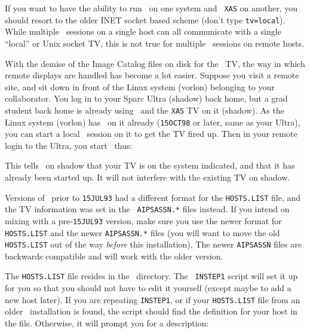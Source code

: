 If you want to have the ability to run \ttaips\ on one system and {\tt
XAS} on another, you should resort to the older INET socket based scheme
(don't type {\tt tv=local}).  While multiple \ttaips\ sessions on a
single host can all communicate with a single ``local'' or Unix socket
TV, this is not true for multiple \ttaips\ sessions on remote hosts.

With the demise of the Image Catalog files on disk for the \AIPS\ TV,
the way in which remote displays are handled has become a lot easier.
Suppose you visit a remote site, and sit down in front of the Linux
system (vorlon) belonging to your collaborator.  You log in to your
Sparc Ultra (shadow) back home, but a grad student back home is already
using \AIPS\ and the {\tt XAS} TV on it (shadow).  As the Linux system
(vorlon) has \AIPS\ on it already ({\tt 15OCT98} or later, same as your
Ultra), you can start a local \ttaips\ session on it to get the TV fired
up.  Then in your remote login to the Ultra, you start \AIPS\ thus:
\medskip

\medskip

\noindent This tells \AIPS\ on shadow that your TV is on the system
indicated, and that it has already been started up.  It will not
interfere with the existing TV on shadow.

Versions of \AIPS\ prior to {\tt 15JUL93} had a different format for the
{\tt HOSTS.LIST} file, and the TV information was set in the {\tt
AIPSASSN.*} files instead.  If you intend on mixing {\tt\THISVER} with a
pre-{\tt 15JUL93} version, make sure you use the newer format for {\tt
HOSTS.LIST} and the newer {\tt AIPSASSN.*} files (you will want to move
the old {\tt HOSTS.LIST} out of the way {\it before\/} this
installation).  The newer {\tt AIPSASSN} files are backwards compatible
and will work with the older version.

\medskip{}

The {\tt HOSTS.LIST} file resides in the \AROOT\ directory.  The {\tt
INSTEP1} script will set it up for you so that you should not have to
edit it yourself (except maybe to add a new host later).  If you are
repeating {\tt INSTEP1}, or if your {\tt HOSTS.LIST} file from an older
\AIPS\ installation is found, the script should find the definition for
your host in the file.  Otherwise, it will prompt you for a
description:\medskip

\medskip

